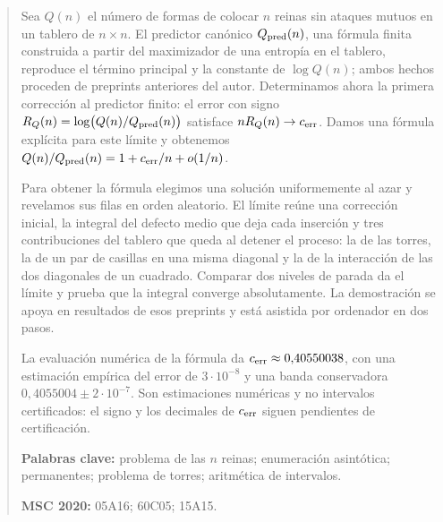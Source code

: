 \begin{abstract}\label{sec:resumen}
\noindent Sea \(Q(n)\) el número de formas de colocar \(n\) reinas sin ataques mutuos en un tablero
de \(n\times n\). El predictor canónico \(Q_{\rm pred}(n)\), una fórmula finita construida a partir del
maximizador de una entropía en el tablero, reproduce el término principal y la
constante de \(\log Q(n)\); ambos hechos proceden de preprints anteriores del autor. Determinamos ahora la
primera corrección al predictor finito:
el error con signo \(R_Q(n)=\log\bigl(Q(n)/Q_{\rm pred}(n)\bigr)\) satisface
\(nR_Q(n)\to\cerr\). Damos una fórmula explícita para este límite y obtenemos
\(Q(n)/Q_{\rm pred}(n)=1+\cerr/n+o(1/n)\).

\smallskip\noindent
Para obtener la fórmula elegimos una solución uniformemente al azar y revelamos sus filas en orden
aleatorio. El límite reúne una corrección inicial, la integral del defecto medio que deja cada
inserción y tres contribuciones del tablero que queda al detener el proceso: la de las torres, la de
un par de casillas en una misma diagonal y la de la interacción de las dos diagonales de un
cuadrado. Comparar dos niveles de parada da el límite y prueba que la integral converge
absolutamente. La demostración se apoya en resultados de esos preprints y está asistida por ordenador en
dos pasos.

\smallskip\noindent
La evaluación numérica de la fórmula da \(\cerr\approx0{,}40550038\), con una estimación empírica del
error de \(3\cdot10^{-8}\) y una banda conservadora \(0{,}4055004\pm2\cdot10^{-7}\). Son estimaciones
numéricas y no intervalos certificados: el signo y los decimales de \(\cerr\) siguen pendientes de
certificación.

\medskip\noindent
\textbf{Palabras clave:} problema de las $n$ reinas; enumeración asintótica; permanentes;
problema de torres; aritmética de intervalos.

\noindent
\textbf{MSC 2020:} 05A16; 60C05; 15A15.
\end{abstract}
